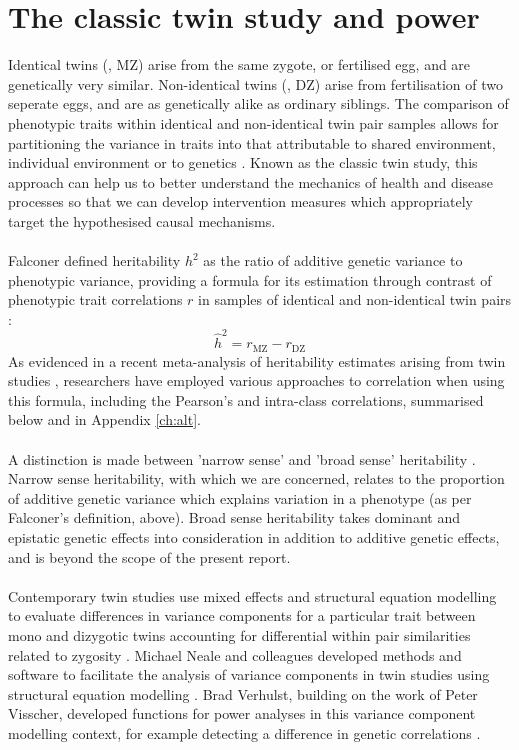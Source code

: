\section{The classic twin study and power}
Identical twins (\mz, MZ) arise from the same zygote, or fertilised egg, and are genetically very similar.  Non-identical twins (\dz, DZ) arise from fertilisation of two seperate eggs, and are as genetically alike as ordinary siblings.  The comparison of phenotypic traits within identical and non-identical twin pair samples allows for partitioning the variance in traits into that attributable to  shared environment, individual environment or to genetics  \cite{Teare2011}.  Known as the classic twin study, this approach can help us to better understand the mechanics of health and disease processes so that we can develop intervention measures which appropriately target the hypothesised causal mechanisms.
\\
\\
Falconer defined heritability $h^2$ as the ratio of additive genetic variance to phenotypic variance, providing a formula for its estimation through contrast of phenotypic trait correlations $r$ in samples of identical and non-identical twin pairs \cite{Falconer1960}:
$$\hat{h}^2 = r_{\text{MZ}} - r_{\text{DZ}}$$
As evidenced in a recent meta-analysis of heritability estimates arising from twin studies \cite{Polderman2015}, researchers have employed various approaches to correlation when using this formula, including the Pearson's and intra-class correlations, summarised below and in Appendix \ref{ch:alt}.  
\\
\\
A distinction is made between 'narrow sense' and 'broad sense' heritability \cite{Visscher2008b}.  Narrow sense heritability, with which we are concerned, relates to the proportion of additive genetic variance which explains variation in a phenotype (as per Falconer's definition, above).  Broad sense heritability takes dominant and epistatic genetic effects into consideration in addition to additive genetic effects, and is beyond the scope of the present report.
\\
\\
Contemporary twin studies use mixed effects and structural equation modelling to evaluate differences in variance components for a particular trait between mono and dizygotic twins accounting for differential within pair similarities related to zygosity \cite{Neale1992,Carlin2005}.  Michael Neale and colleagues developed methods and software to facilitate the analysis of variance components in twin studies using structural equation modelling \cite{Neale1992}.  Brad Verhulst, building on the work of Peter Visscher, developed functions for power analyses in this variance component modelling context, for example detecting a difference in genetic correlations \cite{Verhulst2017,Visscher2004,Visscher2008a}. 
